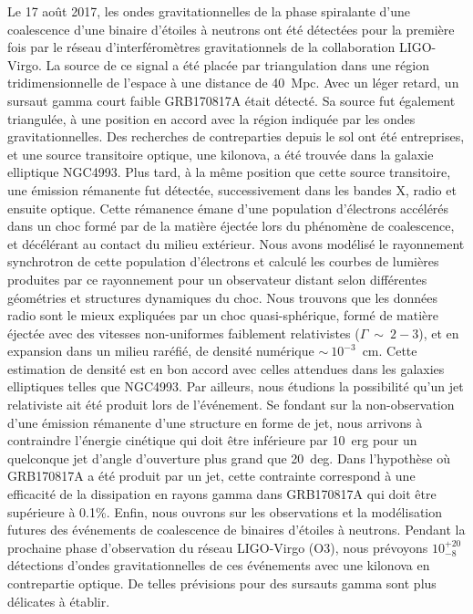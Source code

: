 Le 17 août 2017, les ondes gravitationnelles de la phase spiralante d'une coalescence d'une binaire d'étoiles à neutrons ont été détectées pour la première fois par le réseau d'interféromètres gravitationnels de la collaboration LIGO-Virgo. La source de ce signal a été placée par triangulation dans une région tridimensionnelle de l'espace à une distance de 40~Mpc. Avec un léger retard, un sursaut gamma court faible GRB170817A était détecté. Sa source fut également triangulée, à une position en accord avec la région indiquée par les ondes gravitationnelles. Des recherches de contreparties depuis le sol ont été  entreprises, et une source transitoire optique, une kilonova, a été trouvée dans la galaxie elliptique NGC4993. Plus tard, à la même position que cette source transitoire, une émission rémanente fut détectée, successivement dans les bandes X, radio et ensuite optique. Cette rémanence émane d'une population d'électrons accélérés dans un choc formé par de la matière éjectée lors du phénomène de coalescence, et décélérant au contact du milieu extérieur. Nous avons modélisé le rayonnement synchrotron de cette population d'électrons et calculé les courbes de lumières produites par ce rayonnement pour un observateur distant selon différentes géométries et structures dynamiques du choc. Nous trouvons que les données radio sont le mieux expliquées par un choc quasi-sphérique, formé de matière éjectée avec des vitesses non-uniformes faiblement relativistes ($\Gamma~\sim~2-3$), et en expansion dans un milieu raréfié, de densité numérique $\sim~10^{-3}$~cm. Cette estimation de densité est en bon accord avec celles attendues dans les galaxies elliptiques telles que NGC4993. Par ailleurs, nous étudions la possibilité qu'un jet relativiste ait été produit lors de l'événement. Se fondant sur la non-observation d'une émission rémanente d'une structure en forme de jet, nous arrivons à contraindre l'énergie cinétique qui doit être inférieure par 10~erg pour un quelconque jet d'angle d'ouverture plus grand que 20~deg. Dans l'hypothèse où GRB170817A a été produit par un jet, cette contrainte correspond à une efficacité de la dissipation en rayons gamma dans GRB170817A qui doit être supérieure à 0.1\%. Enfin, nous ouvrons sur les observations et la modélisation futures des événements de coalescence de binaires d'étoiles à neutrons. Pendant la prochaine phase d'observation du réseau LIGO-Virgo (O3), nous prévoyons $10^{+20}_{-8}$ détections d'ondes gravitationnelles de ces événements avec une kilonova en contrepartie optique. De telles prévisions pour des sursauts gamma sont plus délicates à établir.
\newpage


